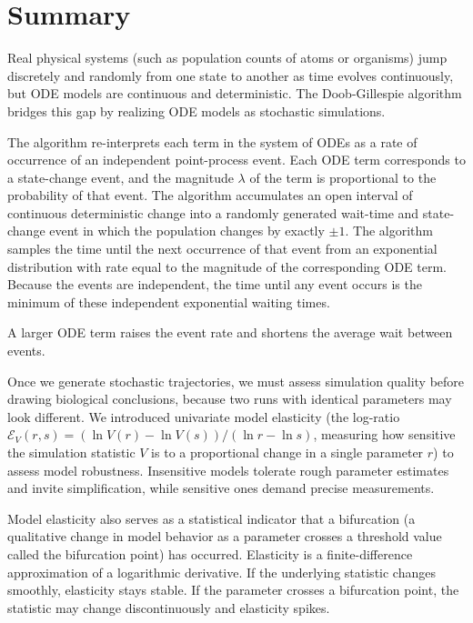 \section{Summary}
\label{sec:summary}

Real physical systems (such as population counts of atoms or organisms) jump discretely and randomly from one state to another as time evolves continuously, but ODE models are continuous and deterministic. The Doob-Gillespie algorithm bridges this gap by realizing ODE models as stochastic simulations.

The algorithm re-interprets each term in the system of ODEs as a rate of occurrence of an independent point-process event. Each ODE term corresponds to a state-change event, and the magnitude $\lambda$ of the term is proportional to the probability of that event. The algorithm accumulates an open interval of continuous deterministic change into a randomly generated wait-time and state-change event in which the population changes by exactly $\pm 1$. The algorithm samples the time until the next occurrence of that event from an exponential distribution with rate equal to the magnitude of the corresponding ODE term. Because the events are independent, the time until any event occurs is the minimum of these independent exponential waiting times.

A larger ODE term raises the event rate and shortens the average wait between events.

Once we generate stochastic trajectories, we must assess simulation quality before drawing biological conclusions, because two runs with identical parameters may look different. We introduced univariate model elasticity (the log-ratio $\mathcal{E}_V(r, s) = (\ln V(r) - \ln V(s))/(\ln r - \ln s)$, measuring how sensitive the simulation statistic $V$ is to a proportional change in a single parameter $r$) to assess model robustness. Insensitive models tolerate rough parameter estimates and invite simplification, while sensitive ones demand precise measurements.

Model elasticity also serves as a statistical indicator that a bifurcation (a qualitative change in model behavior as a parameter crosses a threshold value called the bifurcation point) has occurred. Elasticity is a finite-difference approximation of a logarithmic derivative. If the underlying statistic changes smoothly, elasticity stays stable. If the parameter crosses a bifurcation point, the statistic may change discontinuously and elasticity spikes.

